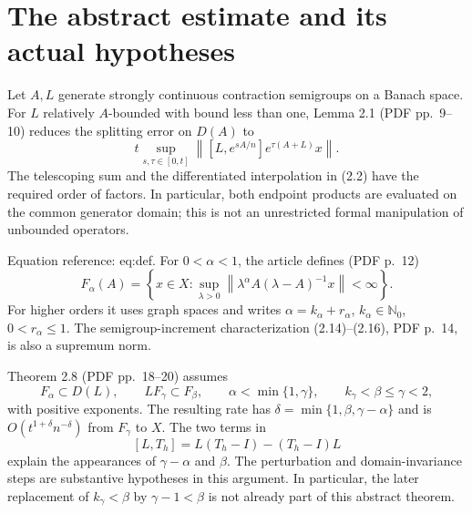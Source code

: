 \documentclass[10pt]{article}
\begin{document}
\section*{The abstract estimate and its actual hypotheses}
Let \(A,L\) generate strongly continuous contraction semigroups on a Banach space. For \(L\) relatively \(A\)-bounded with bound less than one, Lemma 2.1 (PDF pp. 9–10) reduces the splitting error on \(D(A)\) to \[t\sup_{s,\tau\in[0,t]}
 \left\lVert[L,e^{sA/n}]e^{\tau(A+L)}x\right\rVert.\] The telescoping sum and the differentiated interpolation in (2.2) have the required order of factors. In particular, both endpoint products are evaluated on the common generator domain; this is not an unrestricted formal manipulation of unbounded operators.\par
Equation reference: eq:def. For \(0<\alpha<1\), the article defines (PDF p. 12) \[F_\alpha(A)=
 \left\{x\in X:\sup_{\lambda>0}
 \left\lVert\lambda^\alpha A(\lambda-A)^{-1}x\right\rVert<\infty\right\}.
 \tag{2.1}\] For higher orders it uses graph spaces and writes \(\alpha=k_\alpha+r_\alpha\), \(k_\alpha\in\mathbb N_0\), \(0<r_\alpha\le1\). The semigroup-increment characterization (2.14)–(2.16), PDF p. 14, is also a supremum norm.\par
Theorem 2.8 (PDF pp. 18–20) assumes \[F_\alpha\subset D(L),\qquad LF_\gamma\subset F_\beta,\qquad
 \alpha<\min\{1,\gamma\},\qquad
 k_\gamma<\beta\le\gamma<2,\] with positive exponents. The resulting rate has \(\delta=\min\{1,\beta,\gamma-\alpha\}\) and is \(O(t^{1+\delta}n^{-\delta})\) from \(F_\gamma\) to \(X\). The two terms in \[[L,T_h]=L(T_h-I)-(T_h-I)L\] explain the appearances of \(\gamma-\alpha\) and \(\beta\). The perturbation and domain-invariance steps are substantive hypotheses in this argument. In particular, the later replacement of \(k_\gamma<\beta\) by \(\gamma-1<\beta\) is not already part of this abstract theorem.\par
\end{document}

